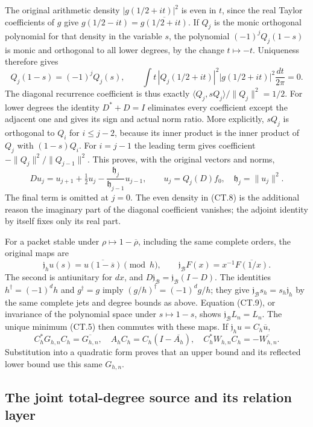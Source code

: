 The original arithmetic density \(|g(1/2+it)|^2\) is even in
\(t\), since the real Taylor coefficients of \(g\) give
\(g(1/2-it)=\overline{g(1/2+it)}\).  If \(Q_j\) is the
monic orthogonal polynomial for that density in the variable \(s\),
the polynomial \((-1)^jQ_j(1-s)\) is monic and orthogonal to
all lower degrees, by the change \(t\mapsto-t\).  Uniqueness
therefore gives
\[
 Q_j(1-s)=(-1)^jQ_j(s),\qquad
 \int t\,|Q_j(1/2+it)|^2|g(1/2+it)|^2\frac{dt}{2\pi}=0.
 \tag{CT.8}
\]
The diagonal recurrence coefficient is thus exactly
\(\langle Q_j,sQ_j\rangle/\|Q_j\|^2=1/2\).
For lower degrees the identity \(D^*+D=I\) eliminates every
coefficient except the adjacent one and gives its sign and actual
norm ratio.  More explicitly, \(sQ_j\) is orthogonal to
\(Q_i\) for \(i\le j-2\), because its inner product is the
inner product of \(Q_j\) with \((1-s)Q_i\).  For \(i=j-1\)
the leading term gives coefficient \(-\|Q_j\|^2/\|Q_{j-1}\|^2\).
This proves, with the original vectors and norms,
\[
 D u_j=u_{j+1}+\tfrac12u_j
       -\frac{\mathfrak h_j}{\mathfrak h_{j-1}}u_{j-1},
 \qquad u_j=Q_j(D)f_0,\quad \mathfrak h_j=\|u_j\|^2.
 \tag{CT.9}
\]
The final term is omitted at \(j=0\).  The even density in
(CT.8) is the additional reason the imaginary part of the diagonal
coefficient vanishes; the adjoint identity by itself fixes only its
real part.

For a packet stable under \(\rho\mapsto1-\overline\rho\),
including the same complete orders, the original maps are
\[
 \mathfrak j_hu(s)=\overline{u(1-\overline s)}\pmod h,\qquad
 \mathfrak j_{\mathscr B}F(x)=x^{-1}\overline{F(1/x)}.
\]
The second is antiunitary for \(dx\), and
\(D\mathfrak j_{\mathscr B}=\mathfrak j_{\mathscr B}(I-D)\).  The identities
\(h^\dagger=(-1)^dh\) and \(g^\dagger=g\) imply
\((g/h)^\dagger=(-1)^d g/h\); they give
\(\mathfrak j_{\mathscr B}s_h=s_h\mathfrak j_h\) by the same complete jets and
degree bounds as above.  Equation (CT.9), or invariance of the
polynomial space under \(s\mapsto1-s\), shows
\(\mathfrak j_{\mathscr B}L_n=L_n\).  The unique minimum (CT.5) then
commutes with these maps.  If \(\mathfrak j_hu=C_h\overline u\),
\[
 C_h^*G_{h,n}C_h=\overline{G_{h,n}},\quad
 A_hC_h=C_h(I-\overline{A_h}),\quad
 C_h^*W_{h,n}C_h=-\overline{W_{h,n}}.                     \tag{CT.10}
\]
Substitution into a quadratic form proves that an upper bound and its
reflected lower bound use this same \(G_{h,n}\).

\subsection{The joint total-degree source and its relation layer}

